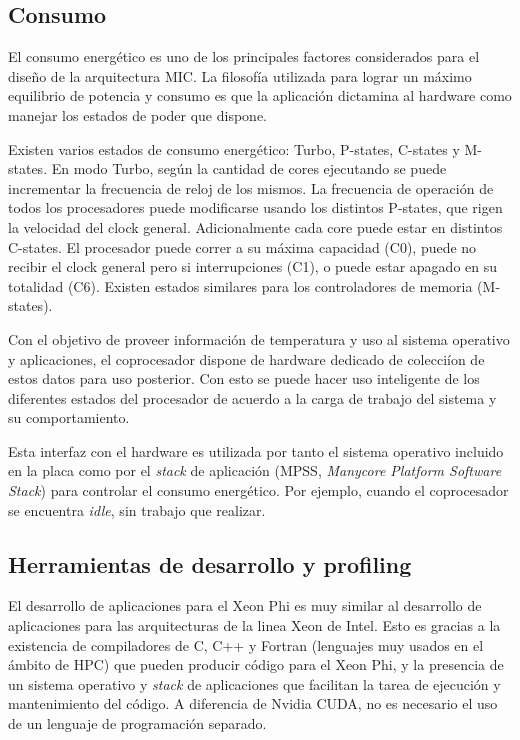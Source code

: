 \subsection{Consumo}

El consumo energ\'etico es uno de los principales factores considerados para el dise\~no de la arquitectura MIC. La filosof\'ia
utilizada para lograr un m\'aximo equilibrio de potencia y consumo es que la aplicaci\'on dictamina al hardware como 
manejar los estados de poder que dispone. 

Existen varios estados de consumo energ\'etico: Turbo, P-states, C-states y M-states. En modo Turbo, seg\'un la cantidad de
cores ejecutando se puede incrementar la frecuencia de reloj de los mismos. La frecuencia de operaci\'on de todos los procesadores
puede modificarse usando los distintos P-states, que rigen la velocidad del clock general. Adicionalmente cada core puede estar en
distintos C-states. El procesador puede correr a su m\'axima capacidad (C0), puede no recibir el clock general pero si interrupciones
(C1), o puede estar apagado en su totalidad (C6). Existen estados similares para los controladores de memoria (M-states).

Con el objetivo de proveer informaci\'on de temperatura y uso al sistema operativo y aplicaciones, el coprocesador dispone de
hardware dedicado de colecci\'ion de estos datos para uso posterior. Con esto se puede hacer uso inteligente de los diferentes
estados del procesador de acuerdo a la carga de trabajo del sistema y su comportamiento.

Esta interfaz con el hardware es utilizada por tanto el sistema operativo incluido en la placa como por el \textit{stack} de
aplicaci\'on (MPSS, \textit{Manycore Platform Software Stack}) para controlar el consumo energ\'etico. Por ejemplo, cuando el
coprocesador se encuentra \textit{idle}, sin trabajo que realizar.

\subsection{Herramientas de desarrollo y profiling}

El desarrollo de aplicaciones para el Xeon Phi es muy similar al desarrollo de aplicaciones para las arquitecturas
de la linea Xeon de Intel. Esto es gracias a la existencia de compiladores de C, C++ y Fortran (lenguajes muy usados en
el \'ambito de HPC) que pueden producir c\'odigo para el Xeon Phi, y la presencia de un sistema operativo y \textit{stack}
de aplicaciones que facilitan la tarea de ejecuci\'on y mantenimiento del c\'odigo. A diferencia de Nvidia CUDA, no es necesario
el uso de un lenguaje de programaci\'on separado.

